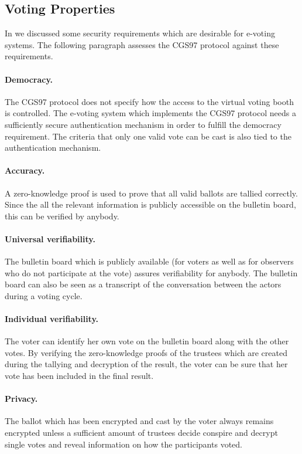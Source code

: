\documentclass[numbers=noenddot, abstract=on, a4paper, headsepline,
footsepline, oneside, openright, draft=off, listof=leveldown]{scrreprt}
\begin{document}
\subsection{Voting Properties}
\label{sec:secproperties}
In  we discussed some security requirements which
are desirable for e-voting systems. The following paragraph assesses the CGS97
protocol against these requirements.

\paragraph{Democracy.} The CGS97 protocol does not specify how the access to
the virtual voting booth is controlled. The e-voting system which implements
the CGS97 protocol needs a sufficiently secure authentication mechanism in order to
fulfill the democracy requirement. The criteria that only one valid vote can be
cast is also tied to the authentication mechanism.

\paragraph{Accuracy.} A zero-knowledge proof is used to prove that all valid
ballots are tallied correctly. Since the all the relevant information is
publicly accessible on the bulletin board, this can be
verified by anybody.

\paragraph{Universal verifiability.} The bulletin board which is publicly
available (for voters as well as for observers who do not participate at the
vote) assures verifiability for anybody. The bulletin board can also
be seen as a transcript of the conversation between the actors during a voting
cycle. 

\paragraph{Individual verifiability.} The voter can identify her own vote on
the bulletin board along with the other votes. By verifying the zero-knowledge
proofs of the trustees which are created during the tallying and
decryption of the result, the voter can be sure that her vote has been included
in the final result.

\paragraph{Privacy.} The ballot which has been encrypted and cast by the
voter always remains encrypted unless a sufficient amount of trustees decide
conspire and decrypt single votes and reveal information on how the participants
voted.
\end{document}
